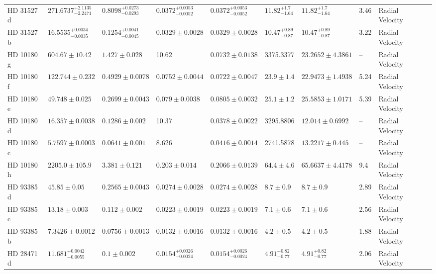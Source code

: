 \begin{tabular}{llllllllll}
HD 31527 d & $271.6737^{+2.1135}_{-2.2471}$ & $0.8098^{+0.0273}_{-0.0293}$ & $0.0372^{+0.0053}_{-0.0052}$ & $0.0372^{+0.0053}_{-0.0052}$ & $11.82^{+1.7}_{-1.64}$ & $11.82^{+1.7}_{-1.64}$ & 3.46 & Radial Velocity & \cite{UDRY_ET_AL__2019} \\
HD 31527 b & $16.5535^{+0.0034}_{-0.0035}$ & $0.1254^{+0.0041}_{-0.0045}$ & $0.0329 \pm 0.0028$ & $0.0329 \pm 0.0028$ & $10.47^{+0.89}_{-0.87}$ & $10.47^{+0.89}_{-0.87}$ & 3.22 & Radial Velocity & \cite{UDRY_ET_AL__2019} \\
HD 10180 g & $604.67 \pm 10.42$ & $1.427 \pm 0.028$ & 10.62 & $0.0732 \pm 0.0138$ & 3375.3377 & $23.2652 \pm 4.3861$ & -- & Radial Velocity & \cite{KANE__AMP__GELINO_2014} \\
HD 10180 f & $122.744 \pm 0.232$ & $0.4929 \pm 0.0078$ & $0.0752 \pm 0.0044$ & $0.0722 \pm 0.0047$ & $23.9 \pm 1.4$ & $22.9473 \pm 1.4938$ & 5.24 & Radial Velocity & \cite{KANE__AMP__GELINO_2014} \\
HD 10180 e & $49.748 \pm 0.025$ & $0.2699 \pm 0.0043$ & $0.079 \pm 0.0038$ & $0.0805 \pm 0.0032$ & $25.1 \pm 1.2$ & $25.5853 \pm 1.0171$ & 5.39 & Radial Velocity & \cite{KANE__AMP__GELINO_2014} \\
HD 10180 d & $16.357 \pm 0.0038$ & $0.1286 \pm 0.002$ & 10.37 & $0.0378 \pm 0.0022$ & 3295.8806 & $12.014 \pm 0.6992$ & -- & Radial Velocity & \cite{KANE__AMP__GELINO_2014} \\
HD 10180 c & $5.7597 \pm 0.0003$ & $0.0641 \pm 0.001$ & 8.626 & $0.0416 \pm 0.0014$ & 2741.5878 & $13.2217 \pm 0.445$ & -- & Radial Velocity & \cite{KANE__AMP__GELINO_2014} \\
HD 10180 h & $2205.0 \pm 105.9$ & $3.381 \pm 0.121$ & $0.203 \pm 0.014$ & $0.2066 \pm 0.0139$ & $64.4 \pm 4.6$ & $65.6637 \pm 4.4178$ & 9.4 & Radial Velocity & \cite{KANE__AMP__GELINO_2014} \\
HD 93385 d & $45.85 \pm 0.05$ & $0.2565 \pm 0.0043$ & $0.0274 \pm 0.0028$ & $0.0274 \pm 0.0028$ & $8.7 \pm 0.9$ & $8.7 \pm 0.9$ & 2.89 & Radial Velocity & \cite{UNGER_ET_AL__2021} \\
HD 93385 c & $13.18 \pm 0.003$ & $0.112 \pm 0.002$ & $0.0223 \pm 0.0019$ & $0.0223 \pm 0.0019$ & $7.1 \pm 0.6$ & $7.1 \pm 0.6$ & 2.56 & Radial Velocity & \cite{UNGER_ET_AL__2021} \\
HD 93385 b & $7.3426 \pm 0.0012$ & $0.0756 \pm 0.0013$ & $0.0132 \pm 0.0016$ & $0.0132 \pm 0.0016$ & $4.2 \pm 0.5$ & $4.2 \pm 0.5$ & 1.88 & Radial Velocity & \cite{UNGER_ET_AL__2021} \\
HD 28471 d & $11.681^{+0.0042}_{-0.0055}$ & $0.1 \pm 0.002$ & $0.0154^{+0.0026}_{-0.0024}$ & $0.0154^{+0.0026}_{-0.0024}$ & $4.91^{+0.82}_{-0.77}$ & $4.91^{+0.82}_{-0.77}$ & 2.06 & Radial Velocity & \cite{STEVENSON_ET_AL_2025} \\

\end{tabular}
